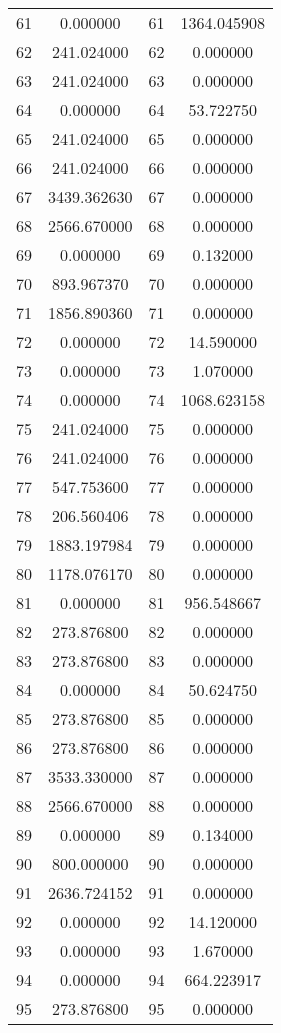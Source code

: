 \documentclass[12pt]{article}
\begin{document}
\begin{longtable}{@{}cccc@{}}
61 & 0.000000 & 61 & 1364.045908 \\
62 & 241.024000 & 62 & 0.000000 \\
63 & 241.024000 & 63 & 0.000000 \\
64 & 0.000000 & 64 & 53.722750 \\
65 & 241.024000 & 65 & 0.000000 \\
66 & 241.024000 & 66 & 0.000000 \\
67 & 3439.362630 & 67 & 0.000000 \\
68 & 2566.670000 & 68 & 0.000000 \\
69 & 0.000000 & 69 & 0.132000 \\
70 & 893.967370 & 70 & 0.000000 \\
71 & 1856.890360 & 71 & 0.000000 \\
72 & 0.000000 & 72 & 14.590000 \\
73 & 0.000000 & 73 & 1.070000 \\
74 & 0.000000 & 74 & 1068.623158 \\
75 & 241.024000 & 75 & 0.000000 \\
76 & 241.024000 & 76 & 0.000000 \\
77 & 547.753600 & 77 & 0.000000 \\
78 & 206.560406 & 78 & 0.000000 \\
79 & 1883.197984 & 79 & 0.000000 \\
80 & 1178.076170 & 80 & 0.000000 \\
81 & 0.000000 & 81 & 956.548667 \\
82 & 273.876800 & 82 & 0.000000 \\
83 & 273.876800 & 83 & 0.000000 \\
84 & 0.000000 & 84 & 50.624750 \\
85 & 273.876800 & 85 & 0.000000 \\
86 & 273.876800 & 86 & 0.000000 \\
87 & 3533.330000 & 87 & 0.000000 \\
88 & 2566.670000 & 88 & 0.000000 \\
89 & 0.000000 & 89 & 0.134000 \\
90 & 800.000000 & 90 & 0.000000 \\
91 & 2636.724152 & 91 & 0.000000 \\
92 & 0.000000 & 92 & 14.120000 \\
93 & 0.000000 & 93 & 1.670000 \\
94 & 0.000000 & 94 & 664.223917 \\
95 & 273.876800 & 95 & 0.000000 \\

\end{longtable}
\end{document}
